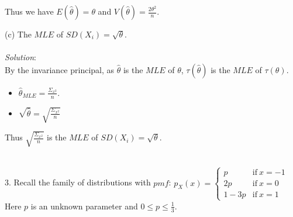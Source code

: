 \documentclass[12pt]{article}
\newcommand{\XB}{\color{black}}
\newcommand{\XBB}{\color{blue}}
\newcommand{\ds}{\displaystyle}
\begin{document}
\noindent
Thus we have $ \ds E(\hat{\theta}) = \theta $ and $ \ds V(\hat{\theta}) = \frac{2\theta^{2}}{n} $. \\

\vspace{2.5mm}

(c) The $ MLE $ of $ SD(X_{i}) = \sqrt{\theta} $. \\
\vspace{2.5mm} \\
\textit{Solution}:
\vspace{2.5mm} \\

\noindent
By the invariance principal, as $ \hat{\theta} $ is the $ MLE $ of $ \theta $, $ \tau(\hat{\theta}) $ is the $ MLE $ of $ \tau(\theta) $. \\

\begin{itemize}
    \item $ \ds \hat{\theta}_{MLE} = \frac{\Sigma_{x^{2}}}{n} $.
    \item $ \ds \sqrt{\hat{\theta}} = \sqrt{\frac{\Sigma_{x^{2}}}{n}} $
\end{itemize}

\noindent
Thus $ \ds \sqrt{\frac{\Sigma_{x^{2}}}{n}} $ is the $ MLE $ of $ SD(X_{i}) = \sqrt{\theta} $. \\

\vspace{2.5mm}

\newpage
\XBB\hrulefill\XB \\

3. Recall the family of distributions with $ \displaystyle pmf $: $p_{X}(x) =
\begin{cases}
    p & \text{if} \  x = -1 \\
    2p &  \text{if} \ x = 0 \\
    1 - 3p & \text{if} \ x = 1
\end{cases} $ \\

Here $ p $ is an unknown parameter and $ \displaystyle 0 \leq p \leq \frac{1}{3} $. \\
\end{document}
